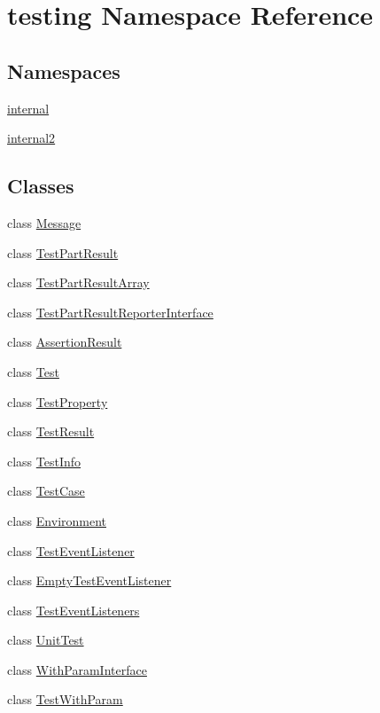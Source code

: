 \hypertarget{namespacetesting}{\section{testing Namespace Reference}
\label{namespacetesting}
}
\subsection*{Namespaces}
\begin{DoxyCompactItemize}
\item 
\hyperlink{namespacetesting_1_1internal}{internal}
\item 
\hyperlink{namespacetesting_1_1internal2}{internal2}
\end{DoxyCompactItemize}
\subsection*{Classes}
\begin{DoxyCompactItemize}
\item 
class \hyperlink{classtesting_1_1Message}{Message}
\item 
class \hyperlink{classtesting_1_1TestPartResult}{Test\-Part\-Result}
\item 
class \hyperlink{classtesting_1_1TestPartResultArray}{Test\-Part\-Result\-Array}
\item 
class \hyperlink{classtesting_1_1TestPartResultReporterInterface}{Test\-Part\-Result\-Reporter\-Interface}
\item 
class \hyperlink{classtesting_1_1AssertionResult}{Assertion\-Result}
\item 
class \hyperlink{classtesting_1_1Test}{Test}
\item 
class \hyperlink{classtesting_1_1TestProperty}{Test\-Property}
\item 
class \hyperlink{classtesting_1_1TestResult}{Test\-Result}
\item 
class \hyperlink{classtesting_1_1TestInfo}{Test\-Info}
\item 
class \hyperlink{classtesting_1_1TestCase}{Test\-Case}
\item 
class \hyperlink{classtesting_1_1Environment}{Environment}
\item 
class \hyperlink{classtesting_1_1TestEventListener}{Test\-Event\-Listener}
\item 
class \hyperlink{classtesting_1_1EmptyTestEventListener}{Empty\-Test\-Event\-Listener}
\item 
class \hyperlink{classtesting_1_1TestEventListeners}{Test\-Event\-Listeners}
\item 
class \hyperlink{classtesting_1_1UnitTest}{Unit\-Test}
\item 
class \hyperlink{classtesting_1_1WithParamInterface}{With\-Param\-Interface}
\item 
class \hyperlink{classtesting_1_1TestWithParam}{Test\-With\-Param}
\end{DoxyCompactItemize}
